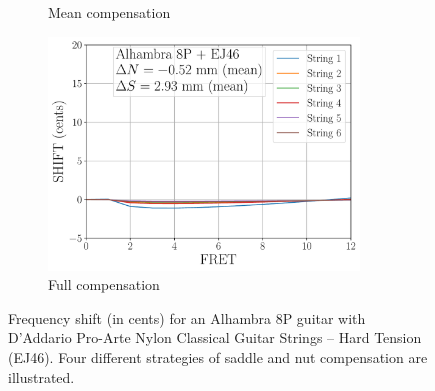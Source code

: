 \begin{figure}
\begin{subfigure}[b]{0.45\textwidth}
   \caption{Mean compensation}
   \label{fig:shift_alhambra8p_ej46_mean}
  \end{subfigure}
  \hspace{0.25in}
  \begin{subfigure}[b]{0.45\textwidth}
   \centering
   \includegraphics[width=3.25in]{figures/shift_alhambra8p_ej46_full}
   \caption{Full compensation}
   \label{fig:shift_alhambra8p_ej46_full}
  \end{subfigure}
  \caption{\label{fig:compensation} Frequency shift (in cents) for an Alhambra 8P guitar with D'Addario Pro-Arte Nylon Classical Guitar Strings -- Hard Tension (EJ46). Four different strategies of saddle and nut compensation are illustrated.}
 \end{figure}


